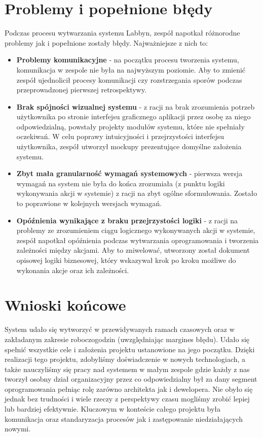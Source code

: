 \section{Problemy i popełnione błędy}
\par
Podczas procesu wytwarzania systemu \gls{Labbyn}, zespół napotkał różnorodne problemy jak i popełnione zostały błędy.
Najważniejsze z nich to:
\begin{itemize}
    \item \textbf{Problemy komunikacyjne} - na początku procesu tworzenia systemu, komunikacja w zespole nie była na najwyższym poziomie. Aby to zmienić zespół ujednolicił procesy komunikacji czy rozstrzegania sporów podczas przeprowadzonej pierwszej retrospektywy.
    \item \textbf{Brak spójności wizualnej systemu} - z racji na brak zrozumienia potrzeb użytkownika po stronie interfejsu graficznego aplikacji przez osobę za niego odpowiedzialną, powstały projekty modułów systemu, które nie spełniały oczekiwań. W celu poprawy intuicyjności i przejrzystości interfejsu użytkownika, zespół utworzył \gls{mockup}y prezentujące domyślne założenia systemu.
    \item \textbf{Zbyt mała granularność wymagań systemowych} - pierwsza wersja wymagań na system nie była do końca zrozumiała (z punktu logiki wykonywania akcji w systemie) z racji na zbyt ogólne sformułowania. Zostało to poprawione w kolejnych wersjach wymagań.
    \item \textbf{Opóźnienia wynikające z braku przejrzystości logiki} - z racji na problemy ze zrozumieniem ciągu logicznego wykonywanych akcji w systemie, zespół napotkał opóźnienia podczas wytwarzania oprogramowania i tworzenia zależności między akcjami. Aby to zniwelować, utworzony został dokument opisowej logiki biznesowej, który wskazywał krok po kroku możliwe do wykonania akcje oraz ich zależności.
\end{itemize}

\section{Wnioski końcowe}
\par
System udało się wytworzyć w przewidywanych ramach czasowych oraz w zakładanym zakresie roboczogodzin (uwzględniając margines błędu).
Udało się spełnić wszystkie cele i założenia projektu ustanowione na jego początku.
Dzięki realizacji tego projektu, zdobyliśmy doświadczenie w nowych technologiach, a także nauczyliśmy się pracy nad systemem w małym zespole gdzie każdy z nas tworzył osobny dział organizacyjny przez co odpowiedzialny był za dany segment oprogramowania pełniąc rolę zarówno architekta jak i dewelopera.
Nie obyło się jednak bez trudności i wiele rzeczy z perspektywy czasu mogliśmy zrobić lepiej lub bardziej efektywnie.
Kluczowym w konteście całego projektu była komunikacja oraz standaryzacja procesów jak i zastępowanie niedziałających nowymi.
